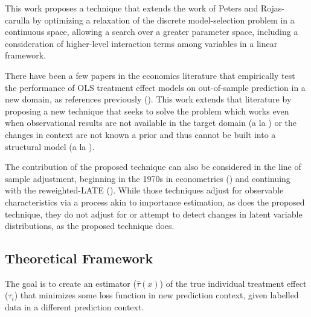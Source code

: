 \documentclass[a4paper,12pt]{article}
\begin{document}
This work proposes a technique that extends the work of Peters \parencite*{Peters2017} and Rojas-carulla \parencite*{Rojas-carulla2018} by optimizing a relaxation of the discrete model-selection problem in a continuous space, allowing a search over a greater parameter space, including a consideration of higher-level interaction terms among variables in a linear framework.

There have been a few papers in the economics literature that empirically test the performance of OLS treatment effect models on out-of-sample prediction in a new domain, as references previously (\cite{Pritchett2016, Rosenzweig2019}). This work extends that literature by proposing a new technique that seeks to solve the problem which works even when observational results are not available in the target domain (a la \cite{Pritchett2016}) or the changes in context are not known a prior and thus cannot be built into a structural model (a la \cite{Rosenzweig2019}).

The contribution of the proposed technique can also be considered in the line of sample adjustment, beginning in the 1970s in econometrics (\cite{Manski1977}) and continuing with the reweighted-LATE (\cite{Angrist2011}). While those techniques adjust for observable characteristics via a process akin to importance estimation, as does the proposed technique, they do not adjust for or attempt to detect changes in latent variable distributions, as the proposed technique does. 


\subsection{ Theoretical Framework }

The goal is to create an estimator ($\hat{\tau}(x)$) of the true individual treatment effect ($\tau_i$) that minimizes some loss function in new prediction context, given labelled data in a different prediction context. 
\end{document}

